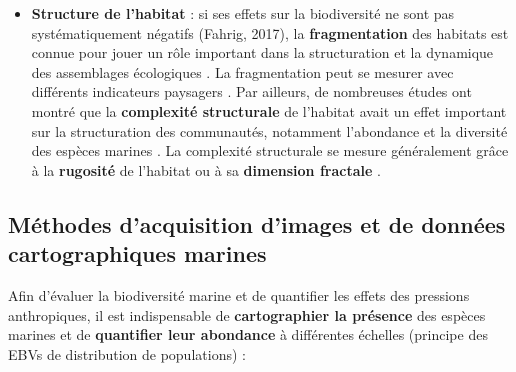 \begin{itemize}
    \item \textbf{Structure de l’habitat} : si ses effets sur la biodiversité ne sont pas systématiquement négatifs (Fahrig, 2017), la \textbf{fragmentation} des habitats est connue pour jouer un rôle important dans la structuration et la dynamique des assemblages écologiques \citep{wilson_habitat_2016, crooks_quantification_2017}. La fragmentation peut se mesurer avec différents indicateurs paysagers \citep{de_montis_landscape_2017}. Par ailleurs, de nombreuses études ont montré que la \textbf{complexité structurale} de l’habitat avait un effet important sur la structuration des communautés, notamment l’abondance et la diversité des espèces marines \citep{luckhurst_analysis_1978, gratwicke_relationship_2005, harborne_biotic_2011, meager_topographic_2011, kovalenko_habitat_2012, graham_importance_2013, rees_abiotic_2014, darling_relationships_2017}. La complexité structurale se mesure généralement grâce à la \textbf{rugosité} de l’habitat \citep{friedman_multi-scale_2012, dustan_digital_2013, leon_measuring_2015} ou à sa \textbf{dimension fractale} \citep{yanovski_structural_2017, young_cost_2017, fukunaga_integrating_2019}.
    
\end{itemize}

\setlength{\fboxsep}{5pt}
\setlength{\fboxrule}{0.6pt}
\noindent{}

\subsection[Méthodes d’acquisition d’images et de données cartographiques marines]{Méthodes d’acquisition d’images et de données \\cartographiques marines}\label{intro.2.2}

Afin d’évaluer la biodiversité marine et de quantifier les effets des pressions anthropiques, il est indispensable de \textbf{cartographier la présence} des espèces marines et de \textbf{quantifier leur abondance} à différentes échelles (principe des EBVs de distribution de populations) :

